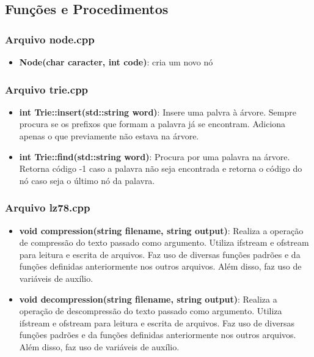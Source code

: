 \documentclass[12pt]{article}
\begin{document}
\subsection{Funções e Procedimentos}
\subsubsection{Arquivo node.cpp}
\begin{itemize}
	\item \textbf{Node(char caracter, int code)}: cria um novo nó
\end{itemize}

\subsubsection{Arquivo trie.cpp}
\begin{itemize}
	\item \textbf{int Trie::insert(std::string word)}: Insere uma palvra à árvore. Sempre procura se os prefixos que formam a palavra já se encontram. Adiciona apenas o que previamente não estava na árvore.
	\item \textbf{int Trie::find(std::string word)}: Procura por uma palavra na árvore. Retorna código -1 caso a palavra não seja encontrada e retorna o código do nó caso seja o último nó da palavra.

\end{itemize}

\subsubsection{Arquivo lz78.cpp}
\begin{itemize}
	\item \textbf{void compression(string filename, string output)}: Realiza a operação de compressão do texto passado como argumento.
	      Utiliza ifstream e ofstream para leitura e escrita de arquivos. Faz uso de diversas funções padrões e da funções definidas anteriormente nos outros arquivos.
	      Além disso, faz uso de variáveis de auxílio.
	\item \textbf{void decompression(string filename, string output)}: Realiza a operação de descompressão do texto passado como argumento.
	      Utiliza ifstream e ofstream para leitura e escrita de arquivos. Faz uso de diversas funções padrões e da funções definidas anteriormente nos outros arquivos.
	      Além disso, faz uso de variáveis de auxílio.
\end{itemize}
\end{document}
